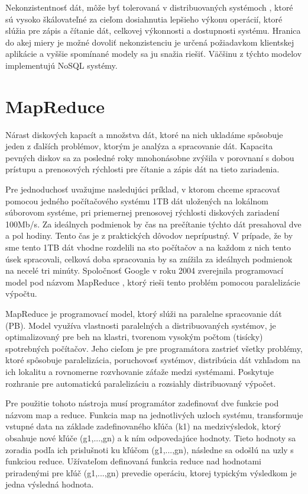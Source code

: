 \documentclass[11pt,twoside,a4paper]{book}
\begin{document}
Nekonzistentnosť dát, môže byť tolerovaná v distribuovaných systémoch , ktoré sú vysoko škálovateľné za cieľom dosiahnutia lepšieho výkonu operácií, ktoré slúžia pre zápis a čítanie dát, celkovej výkonnosti a dostupnosti systému. Hranica do akej miery je možné dovoliť nekonzistenciu je určená požiadavkom klientskej aplikácie a vyššie spomínané modely sa ju snažia riešiť. Väčšinu z týchto modelov implementujú NoSQL systémy.




\section{MapReduce}
Nárast diskových kapacít a množstva dát, ktoré na nich ukladáme spôsobuje jeden z ďalších problémov, ktorým je analýza a spracovanie dát. Kapacita pevných diskov sa za posledné roky mnohonásobne zvýšila v porovnaní s dobou prístupu a prenosových rýchlosti pre čítanie a zápis dát na tieto zariadenia.

Pre jednoduchosť uvažujme nasledujúci príklad, v ktorom chceme spracovať pomocou jedného počítačového systému 1TB dát uložených na lokálnom súborovom systéme, pri priemernej prenosovej rýchlosti diskových zariadení 100Mb/s. Za ideálnych podmienok by čas na prečítanie týchto dát presahoval dve a pol hodiny. Tento čas je z praktických dôvodov neprípustný. V prípade, že by sme tento 1TB dát vhodne rozdelili na sto počítačov a na každom z nich tento úsek spracovali, celková doba spracovania by sa znížila za ideálnych podmienok na necelé tri minúty. Spoločnosť Google v roku 2004 zverejnila programovací model pod názvom MapReduce \cite{mapreduce}, ktorý rieši tento problém pomocou paralelizácie výpočtu.

MapReduce je programovací model, ktorý slúži na paralelne spracovanie dát (PB). Model využíva vlastnosti paralelných a distribuovaných systémov, je optimalizovaný pre beh na klastri, tvorenom vysokým počtom (tisícky) spotrebných počítačov. Jeho cieľom je pre programátora zastrieť všetky problémy, ktoré spôsobuje paralelizácia, poruchovosť systémov, distribúcia dát vzhľadom na ich lokalitu a rovnomerne rozvhovanie záťaže medzi systémami. Poskytuje rozhranie pre automatickú paralelizáciu a rozsiahly distribuovaný výpočet.

Pre použitie tohoto nástroja musí programátor zadefinovať dve funkcie pod názvom map a reduce. Funkcia map na jednotlivých uzloch systému, transformuje vstupné data na základe zadefinovaného kľúča (k1) na medzivýsledok, ktorý obsahuje nové kľúče (g1,...,gn) a k ním odpovedajúce hodnoty. Tieto hodnoty sa zoradia podľa ich prislušnoti ku kľúčom (g1,...,gn), následne sa odošlú na uzly s funkciou reduce. Užívateľom definovaná funkcia reduce nad hodnotami priradenými pre kľúč (g1,...,gn) prevedie operáciu, ktorej typickým výsledkom je jedna výsledná hodnota.
\end{document}

